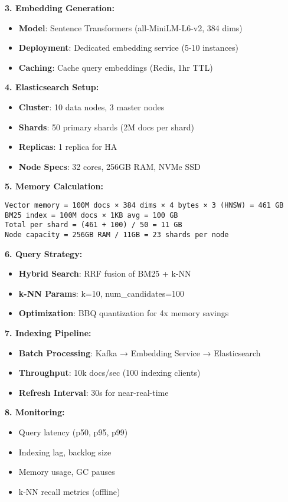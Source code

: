 \documentclass[10pt]{article}
\begin{document}
\textbf{3. Embedding Generation:}
\begin{itemize}
\item \textbf{Model}: Sentence Transformers (all-MiniLM-L6-v2, 384 dims)
\item \textbf{Deployment}: Dedicated embedding service (5-10 instances)
\item \textbf{Caching}: Cache query embeddings (Redis, 1hr TTL)
\end{itemize}

\textbf{4. Elasticsearch Setup:}
\begin{itemize}
\item \textbf{Cluster}: 10 data nodes, 3 master nodes
\item \textbf{Shards}: 50 primary shards (2M docs per shard)
\item \textbf{Replicas}: 1 replica for HA
\item \textbf{Node Specs}: 32 cores, 256GB RAM, NVMe SSD
\end{itemize}

\textbf{5. Memory Calculation:}
\begin{verbatim}
Vector memory = 100M docs × 384 dims × 4 bytes × 3 (HNSW) = 461 GB
BM25 index = 100M docs × 1KB avg = 100 GB
Total per shard = (461 + 100) / 50 = 11 GB
Node capacity = 256GB RAM / 11GB = 23 shards per node
\end{verbatim}

\textbf{6. Query Strategy:}
\begin{itemize}
\item \textbf{Hybrid Search}: RRF fusion of BM25 + k-NN
\item \textbf{k-NN Params}: k=10, num\_candidates=100
\item \textbf{Optimization}: BBQ quantization for 4x memory savings
\end{itemize}

\textbf{7. Indexing Pipeline:}
\begin{itemize}
\item \textbf{Batch Processing}: Kafka → Embedding Service → Elasticsearch
\item \textbf{Throughput}: 10k docs/sec (100 indexing clients)
\item \textbf{Refresh Interval}: 30s for near-real-time
\end{itemize}

\textbf{8. Monitoring:}
\begin{itemize}
\item Query latency (p50, p95, p99)
\item Indexing lag, backlog size
\item Memory usage, GC pauses
\item k-NN recall metrics (offline)
\end{itemize}
\end{document}
